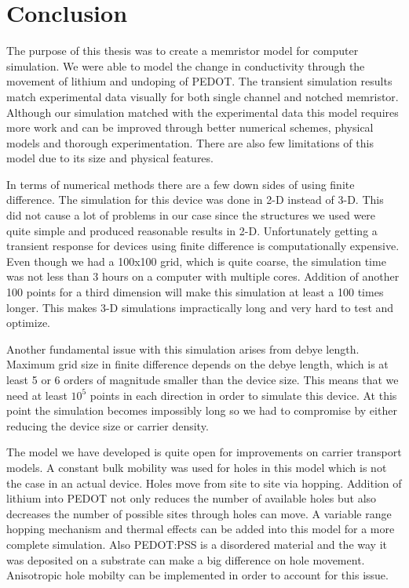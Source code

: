 
\chapter{Conclusion} %

\label{Chapter7} %


\begin{doublespace}
The purpose of this thesis was to create a memristor model for computer simulation. We were able to model the change in conductivity through the movement of lithium and undoping of PEDOT. The transient simulation results match experimental data visually for both single channel and notched memristor. Although our simulation matched with the experimental data this model requires more work and can be improved through better numerical schemes, physical models and thorough experimentation. There are also few limitations of this model due to its size and physical features.

In terms of numerical methods there are a few down sides of using finite difference. The simulation for this device was done in 2-D instead of 3-D. This did not cause a lot of problems in our case since the structures we used were quite simple and produced reasonable results in 2-D. Unfortunately getting a transient response for devices using finite difference is computationally expensive. Even though we had a 100x100 grid, which is quite coarse, the simulation time was not less than 3 hours on a computer with multiple cores. Addition of another 100 points for a third dimension will make this simulation at least a 100 times longer. This makes 3-D simulations impractically long and very hard to test and optimize.

Another fundamental issue with this simulation arises from debye length. Maximum grid size in finite difference depends on the debye length, which is at least 5 or 6 orders of magnitude smaller than the device size. This means that we need at least $10^5$ points in each direction in order to simulate this device. At this point the simulation becomes impossibly long so we had to compromise by either reducing the device size or carrier density.     

The model we have developed is quite open for improvements on carrier transport models. A constant bulk mobility was used for holes in this model which is not the case in an actual device. Holes move from site to site via hopping. Addition of lithium into PEDOT not only reduces the number of available holes but also decreases the number of possible sites through holes can move. A variable range hopping mechanism and thermal effects can be added into this model for a more complete simulation. Also PEDOT:PSS is a disordered material and the way it was deposited on a substrate can make a big difference on hole movement. Anisotropic hole mobilty can be implemented in order to account for this issue.


\end{doublespace}
